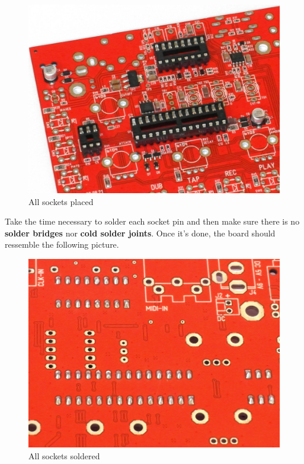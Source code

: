 \documentclass{scrartcl}
\begin{document}
\begin{figure}[!ht]
    \begin{center}
        \includegraphics[scale=0.28]{assets/pcb-sockets.jpg}
        \caption{All sockets placed}
    \end{center}
\end{figure}
Take the time necessary to solder each socket pin and then make sure there is no \textbf{solder bridges} nor \textbf{cold solder joints}. Once it's done, the board should ressemble the following picture.

\begin{figure}[!ht]
    \begin{center}
        \includegraphics[scale=0.22]{assets/ic-solder.jpg}
        \caption{All sockets soldered}
    \end{center}
\end{figure}
\end{document}
